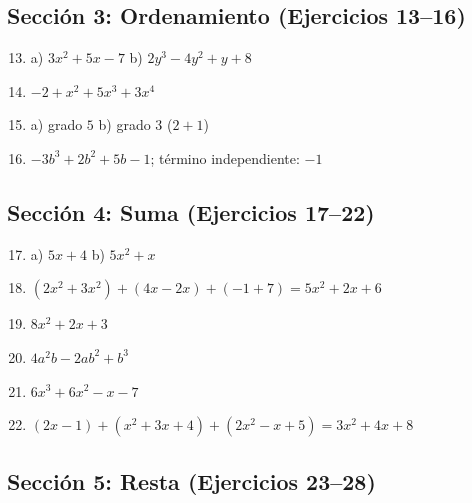 \documentclass[12pt, letterpaper]{article}
\begin{document}
  \newpage

  \subsection*{Sección 3: Ordenamiento (Ejercicios 13--16)}

  \begin{enumerate}[leftmargin=*, label=\textbf{\arabic*.}]
    \setcounter{enumi}{12}
    \item a) $3x^2 + 5x - 7$ \quad b) $2y^3 - 4y^2 + y + 8$

    \item $-2 + x^2 + 5x^3 + 3x^4$

    \item a) grado $5$ \quad b) grado $3$ ($2 + 1$)

    \item $-3b^3 + 2b^2 + 5b - 1$; término independiente: $-1$
  \end{enumerate}

  \newpage

  \subsection*{Sección 4: Suma (Ejercicios 17--22)}

  \begin{enumerate}[leftmargin=*, label=\textbf{\arabic*.}]
    \setcounter{enumi}{16}
    \item a) $5x + 4$ \quad b) $5x^2 + x$

    \item $(2x^2 + 3x^2) + (4x - 2x) + (-1 + 7) = 5x^2 + 2x + 6$

    \item $8x^2 + 2x + 3$

    \item $4a^2b - 2ab^2 + b^3$

    \item $6x^3 + 6x^2 - x - 7$

    \item $(2x - 1) + (x^2 + 3x + 4) + (2x^2 - x + 5) = 3x^2 + 4x + 8$
  \end{enumerate}

  \newpage

  \subsection*{Sección 5: Resta (Ejercicios 23--28)}
\end{document}
